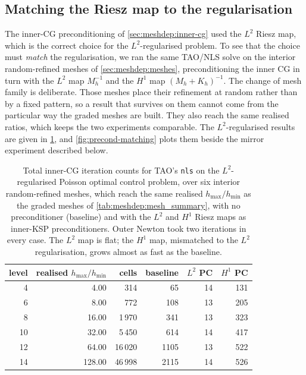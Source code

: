 \documentclass[a4paper,11pt]{article}
\theoremstyle{spacedplain} \newtheorem{theorem}[counter]{Theorem} \newtheorem{lemma}[counter]{Lemma} \newtheorem{prop}[counter]{Proposition} \newtheorem{cor}[counter]{Corollary}
\theoremstyle{spaceddefinition} \newtheorem{defn}[counter]{Definition} \newtheorem{example}[counter]{Example} \newtheorem{remark}[counter]{Remark}
\begin{document}
\subsection{Matching the Riesz map to the regularisation}
\label{sec:meshdep:matching}

The inner-CG preconditioning of \cref{sec:meshdep:inner-cg} used the $L^{2}$ Riesz map, which is the correct choice for the $L^{2}$-regularised problem. To see that the choice must \emph{match} the regularisation, we ran the same TAO/NLS solve on the interior random-refined meshes of \cref{sec:meshdep:meshes}, preconditioning the inner CG in turn with the $L^{2}$ map $M_h^{-1}$ and the $H^{1}$ map $(M_h + K_h)^{-1}$. The change of mesh family is deliberate. Those meshes place their refinement at random rather than by a fixed pattern, so a result that survives on them cannot come from the particular way the graded meshes are built. They also reach the same realised ratios, which keeps the two experiments comparable. The $L^{2}$-regularised results are given in \cref{tab:meshdep:matching}, and \cref{fig:precond-matching} plots them beside the mirror experiment described below.

\begin{table}[H]
  \centering
  \begin{tabular}{r r r r r r}
    \toprule
    {level} & {realised $h_{\max}/h_{\min}$} & {cells}
      & {baseline} & {$L^{2}$ PC} & {$H^{1}$ PC} \\
    \midrule
      4 &   4.00 &     314 &   65 & 14 & 131 \\
      6 &   8.00 &     772 &  108 & 13 & 205 \\
      8 &  16.00 &   1\,970 &  341 & 13 & 323 \\
     10 &  32.00 &   5\,450 &  614 & 14 & 417 \\
     12 &  64.00 &  16\,020 & 1105 & 13 & 522 \\
     14 & 128.00 &  46\,998 & 2115 & 14 & 526 \\
    \bottomrule
  \end{tabular}
  \caption{Total inner-CG iteration counts for TAO's \texttt{nls} on the $L^{2}$-regularised Poisson optimal control problem, over six interior random-refined meshes, which reach the same realised $h_{\max}/h_{\min}$ as the graded meshes of \cref{tab:meshdep:mesh_summary}, with no preconditioner (baseline) and with the $L^{2}$ and $H^{1}$ Riesz maps as inner-KSP preconditioners. Outer Newton took two iterations in every case. The $L^{2}$ map is flat; the $H^{1}$ map, mismatched to the $L^{2}$ regularisation, grows almost as fast as the baseline.}
  \label{tab:meshdep:matching}
\end{table}
\end{document}
